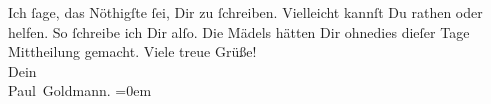 \begin{ledgroupsized}[t]{13cm}
               Ich ſage, das Nöthigſte ſei, Dir zu {\pb}ſchreiben.
               Vielleicht kannſt Du rathen oder helfen. So ſchreibe ich Dir alſo. Die Mädels hätten Dir
               ohnedies dieſer Tage Mittheilung gemacht.\pend
           \pstart
           Viele treue Grüße! {\\[\baselineskip]}Dein {\\[\baselineskip]}\spacefill\mbox{Paul Goldmann.}\pend
           \leftskip=0em{}
         
         \endnumbering{}\end{ledgroupsized}  \newcommand{\dateiname}{L02918}\newcommand{\titel}{Paul Goldmann an Arthur Schnitzler, 31. 5. [1900]}\newcommand{\editorInnen}{Martin Anton Müller und Laura Untner}
      